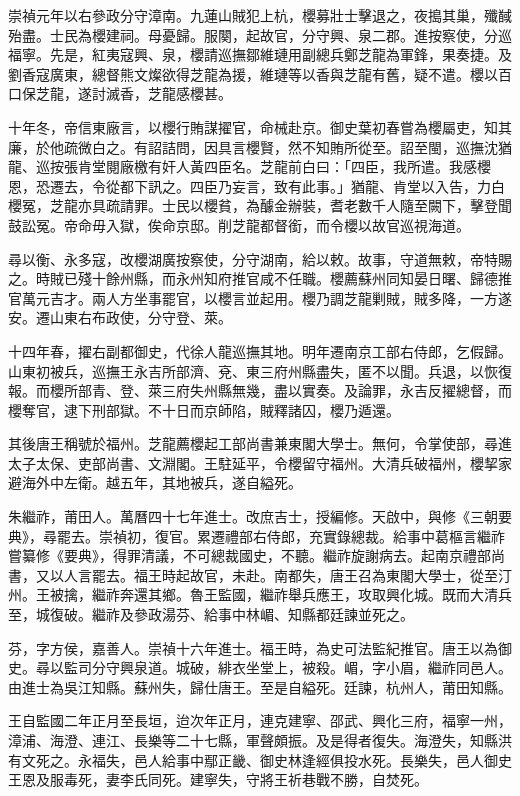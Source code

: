 \begin{pinyinscope}
崇禎元年以右參政分守漳南。九蓮山賊犯上杭，櫻募壯士擊退之，夜搗其巢，殲馘殆盡。士民為櫻建祠。母憂歸。服闋，起故官，分守興、泉二郡。進按察使，分巡福寧。先是，紅夷寇興、泉，櫻請巡撫鄒維璉用副總兵鄭芝龍為軍鋒，果奏捷。及劉香寇廣東，總督熊文燦欲得芝龍為援，維璉等以香與芝龍有舊，疑不遣。櫻以百口保芝龍，遂討滅香，芝龍感櫻甚。

十年冬，帝信東廠言，以櫻行賄謀擢官，命械赴京。御史葉初春嘗為櫻屬吏，知其廉，於他疏微白之。有詔詰問，因具言櫻賢，然不知賄所從至。詔至閩，巡撫沈猶龍、巡按張肯堂閱廠檄有奸人黃四臣名。芝龍前白曰：「四臣，我所遣。我感櫻恩，恐遷去，令從都下訊之。四臣乃妄言，致有此事。」猶龍、肯堂以入告，力白櫻冤，芝龍亦具疏請罪。士民以櫻貧，為醵金辦裝，耆老數千人隨至闕下，擊登聞鼓訟冤。帝命毋入獄，俟命京邸。削芝龍都督銜，而令櫻以故官巡視海道。

尋以衡、永多寇，改櫻湖廣按察使，分守湖南，給以敕。故事，守道無敕，帝特賜之。時賊已殘十餘州縣，而永州知府推官咸不任職。櫻薦蘇州同知晏日曙、歸德推官萬元吉才。兩人方坐事罷官，以櫻言並起用。櫻乃調芝龍剿賊，賊多降，一方遂安。遷山東右布政使，分守登、萊。

十四年春，擢右副都御史，代徐人龍巡撫其地。明年遷南京工部右侍郎，乞假歸。山東初被兵，巡撫王永吉所部濟、兗、東三府州縣盡失，匿不以聞。兵退，以恢復報。而櫻所部青、登、萊三府失州縣無幾，盡以實奏。及論罪，永吉反擢總督，而櫻奪官，逮下刑部獄。不十日而京師陷，賊釋諸囚，櫻乃遁還。

其後唐王稱號於福州。芝龍薦櫻起工部尚書兼東閣大學士。無何，令掌使部，尋進太子太保、吏部尚書、文淵閣。王駐延平，令櫻留守福州。大清兵破福州，櫻挈家避海外中左衛。越五年，其地被兵，遂自縊死。

朱繼祚，莆田人。萬曆四十七年進士。改庶吉士，授編修。天啟中，與修《三朝要典》，尋罷去。崇禎初，復官。累遷禮部右侍郎，充實錄總裁。給事中葛樞言繼祚嘗纂修《要典》，得罪清議，不可總裁國史，不聽。繼祚旋謝病去。起南京禮部尚書，又以人言罷去。福王時起故官，未赴。南都失，唐王召為東閣大學士，從至汀州。王被擒，繼祚奔還其鄉。魯王監國，繼祚舉兵應王，攻取興化城。既而大清兵至，城復破。繼祚及參政湯芬、給事中林嵋、知縣都廷諫並死之。

芬，字方侯，嘉善人。崇禎十六年進士。福王時，為史可法監紀推官。唐王以為御史。尋以監司分守興泉道。城破，緋衣坐堂上，被殺。嵋，字小眉，繼祚同邑人。由進士為吳江知縣。蘇州失，歸仕唐王。至是自縊死。廷諫，杭州人，莆田知縣。

王自監國二年正月至長垣，迨次年正月，連克建寧、邵武、興化三府，福寧一州，漳浦、海澄、連江、長樂等二十七縣，軍聲頗振。及是得者復失。海澄失，知縣洪有文死之。永福失，邑人給事中鄢正畿、御史林逢經俱投水死。長樂失，邑人御史王恩及服毒死，妻李氏同死。建寧失，守將王祈巷戰不勝，自焚死。


\end{pinyinscope}
